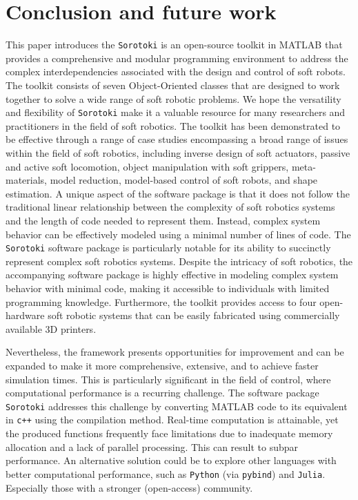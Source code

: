 
\section{Conclusion and future work}
\label{sec:C5:conclusion}
This paper introduces the \texttt{Sorotoki} is an open-source toolkit in {MATLAB} that provides a comprehensive and modular programming environment to address the complex interdependencies associated with the design and control of soft robots. The toolkit consists of seven Object-Oriented classes that are designed to work together to solve a wide range of soft robotic problems. We hope the versatility and flexibility of \texttt{Sorotoki} make it a valuable resource for many researchers and practitioners in the field of soft robotics. The toolkit has been demonstrated to be effective through a range of case studies encompassing a broad range of issues within the field of soft robotics, including inverse design of soft actuators, passive and active soft locomotion, object manipulation with soft grippers, meta-materials, model reduction, model-based control of soft robots, and shape estimation. A unique aspect of the software package is that it does not follow the traditional linear relationship between the complexity of soft robotics systems and the length of code needed to represent them. Instead, complex system behavior can be effectively modeled using a minimal number of lines of code. The \texttt{Sorotoki} software package is particularly notable for its ability to succinctly represent complex soft robotics systems. Despite the intricacy of soft robotics, the accompanying software package is highly effective in modeling complex system behavior with minimal code, making it accessible to individuals with limited programming knowledge. Furthermore, the toolkit provides access to four open-hardware soft robotic systems that can be easily fabricated using commercially available 3D printers.

Nevertheless, the framework presents opportunities for improvement and can be expanded to make it more comprehensive, extensive, and to achieve faster simulation times. This is particularly significant in the field of control, where computational performance is a recurring challenge. The software package \texttt{Sorotoki} addresses this challenge by converting {MATLAB} code to its equivalent in \texttt{c++} using the compilation method. Real-time computation is attainable, yet the produced  functions frequently face limitations due to inadequate memory allocation and a lack of parallel processing. This can result to subpar performance. An alternative solution could be to explore other languages with better computational performance, such as \texttt{Python} (via \texttt{pybind}) and \texttt{Julia}. Especially those with a stronger (open-access) community. %

